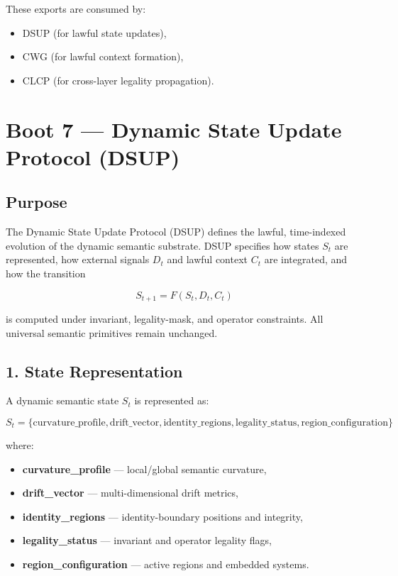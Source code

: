 These exports are consumed by:
\begin{itemize}[leftmargin=1.2cm]
    \item DSUP (for lawful state updates),
    \item CWG (for lawful context formation),
    \item CLCP (for cross-layer legality propagation).
\end{itemize}

\section*{Boot 7 — Dynamic State Update Protocol (DSUP)}
\label{boot:dynamic_state_update_protocol}

\subsection*{Purpose}

The Dynamic State Update Protocol (DSUP) defines the lawful, time-indexed
evolution of the dynamic semantic substrate. DSUP specifies how states $S_t$ are
represented, how external signals $D_t$ and lawful context $C_t$ are integrated,
and how the transition



\[
S_{t+1} = F(S_t, D_t, C_t)
\]



is computed under invariant, legality-mask, and operator constraints.  
All universal semantic primitives remain unchanged.

\subsection*{1. State Representation}
\label{boot:dsup_state_representation}

A dynamic semantic state $S_t$ is represented as:



\[
S_t = \{
    \text{curvature\_profile},
    \text{drift\_vector},
    \text{identity\_regions},
    \text{legality\_status},
    \text{region\_configuration}
\}
\]



where:
\begin{itemize}[leftmargin=1.2cm]
    \item \textbf{curvature\_profile} — local/global semantic curvature,
    \item \textbf{drift\_vector} — multi-dimensional drift metrics,
    \item \textbf{identity\_regions} — identity-boundary positions and integrity,
    \item \textbf{legality\_status} — invariant and operator legality flags,
    \item \textbf{region\_configuration} — active regions and embedded systems.
\end{itemize}

